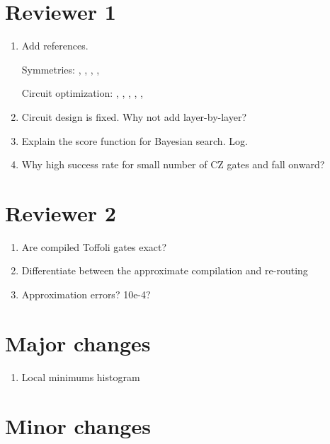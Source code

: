 \documentclass[amsfonts, amssymb, aps, nofootinbib]{revtex4-2}
\begin{document}
\section{Reviewer 1}
\begin{enumerate}
	\item Add references.

	Symmetries: \cite{Barkoutsos2018}, \cite{Lyu2020}, \cite{Coyle2020}, \cite{Bravyi2020}, \cite{Lyu2022}
	
	Circuit optimization: \cite{Cincio2021}, \cite{Huang2022b}, \cite{Du2022}, \cite{Chivilikhin2020}, \cite{Wang2021}, \cite{Franken2020}
	\item Circuit design is fixed. Why not add layer-by-layer?
	\item Explain the score function for Bayesian search. Log.
	\item Why high success rate for small number of CZ gates and fall onward?

\end{enumerate}
\section{Reviewer 2}
\begin{enumerate}
	\item Are compiled Toffoli gates exact?
	\item Differentiate between the approximate compilation and re-routing
	\item Approximation errors? 10e-4?
\end{enumerate}

\section{Major changes}
\begin{enumerate}
	\item Local minimums histogram
\end{enumerate}
\section{Minor changes}


\end{document}
